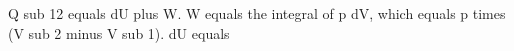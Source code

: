 Q sub 12 equals dU plus W.  
W equals the integral of p dV, which equals p times (V sub 2 minus V sub 1).  
dU equals